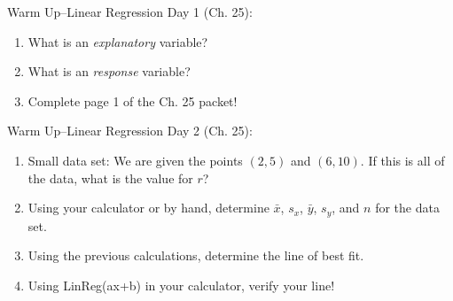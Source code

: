 \documentclass[12pt]{amsart}
\theoremstyle{definition}
\begin{document}
   \begin{framed}
      Warm Up--Linear Regression Day 1 (Ch. 25):
      \begin{enumerate}
      \item What is an \emph{explanatory} variable?
      \item What is an \emph{response} variable?
      \item Complete page 1 of the Ch. 25 packet!
      \end{enumerate}
      \end{framed}

 \begin{framed}
      Warm Up--Linear Regression Day 2 (Ch. 25):
      \begin{enumerate}
      \item Small data set: We are given the points $(2,5)$ and $(6,10)$. If this is all of the data, what is the value for $r$?
      \item Using your calculator or by hand, determine $\bar{x}$, $s_x$, $\bar{y}$, $s_y$, and $n$ for the data set.
      \item Using the previous calculations, determine the line of best fit.
      \item Using LinReg(ax+b) in your calculator, verify your line!
      \end{enumerate}
      \end{framed}
\end{document}
